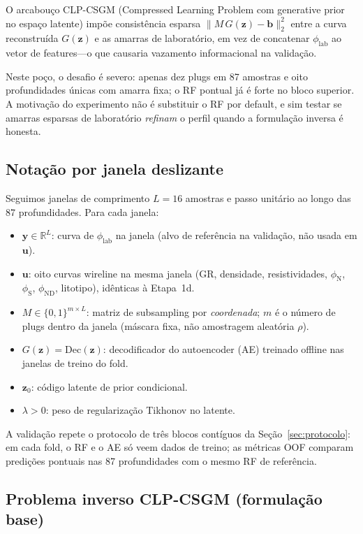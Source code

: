 \documentclass[11pt,a4paper]{article}
\newcommand{\philab}{\ensuremath{\phi_{\mathrm{lab}}}}
\newcommand{\phiND}{\ensuremath{\phi_{\mathrm{ND}}}}
\newcommand{\zvec}{\ensuremath{\mathbf{z}}}
\newcommand{\zzero}{\ensuremath{\mathbf{z}_0}}
\begin{document}
O arcabouço CLP-CSGM (Compressed Learning Problem com generative
prior no espaço latente) impõe consistência esparsa
$\|M\,G(\zvec)-\mathbf{b}\|_2^2$ entre a curva reconstruída
$G(\zvec)$ e as amarras de laboratório, em vez de concatenar \philab{}
ao vetor de features---o que causaria vazamento informacional na
validação.

Neste poço, o desafio é severo: apenas dez plugs em 87 amostras e oito
profundidades únicas com amarra fixa; o RF pontual já é forte no bloco
superior.
A motivação do experimento não é substituir o RF por default, e sim
testar se amarras esparsas de laboratório \emph{refinam} o perfil quando
a formulação inversa é honesta.

\subsection{Notação por janela deslizante}

Seguimos janelas de comprimento $L=16$ amostras e passo unitário ao
longo das 87 profundidades.
Para cada janela:

\begin{itemize}
  \item $\mathbf{y}\in\mathbb{R}^{L}$: curva de \philab{} na janela
        (alvo de referência na validação, não usada em $\mathbf{u}$).
  \item $\mathbf{u}$: oito curvas wireline na mesma janela (GR, densidade,
        resistividades, $\phi_{\mathrm{N}}$, $\phi_{\mathrm{S}}$, \phiND{},
        litotipo), idênticas à Etapa~1d.
  \item $M\in\{0,1\}^{m\times L}$: matriz de subsampling por
        \emph{coordenada}; $m$ é o número de plugs dentro da janela
        (máscara fixa, não amostragem aleatória $\rho$).
  \item $G(\zvec)=\mathrm{Dec}(\zvec)$: decodificador do autoencoder
        (AE) treinado offline nas janelas de treino do fold.
  \item $\zzero$: código latente de prior condicional.
  \item $\lambda>0$: peso de regularização Tikhonov no latente.
\end{itemize}

A validação repete o protocolo de três blocos contíguos da
Seção~\ref{sec:protocolo}: em cada fold, o RF e o AE só veem dados de
treino; as métricas OOF comparam predições pontuais nas 87 profundidades
com o mesmo RF de referência.

\subsection{Problema inverso CLP-CSGM (formulação base)}
\end{document}
